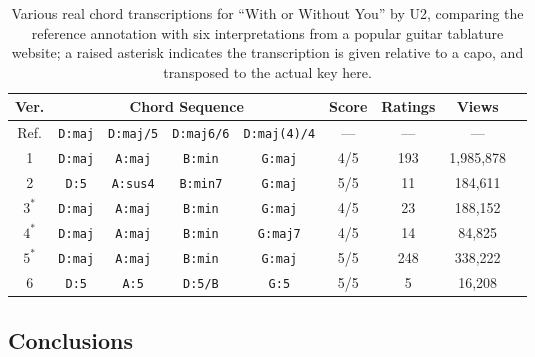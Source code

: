 \begin{table}[!t]
\small
\caption{Various real chord transcriptions for ``With or Without You'' by U2, comparing the reference annotation with six interpretations from a popular guitar tablature website; a raised asterisk indicates the transcription is given relative to a capo, and transposed to the actual key here.}
\label{tab:wowu_chords}
\centering
\begin{tabular}{ c || c c c c | c c c c |}
Ver. & \multicolumn{4}{c}{Chord Sequence} & Score & Ratings & Views \\
 \hline
Ref. & \texttt{D:maj} & \texttt{D:maj/5} & \texttt{D:maj6/6} & \texttt{D:maj(4)/4} & --- & --- & --- \\
\hline
1 & \texttt{D:maj} & \texttt{A:maj} & \texttt{B:min} & \texttt{G:maj} & 4/5 & 193 & 1,985,878 \\
2 & \texttt{D:5} & \texttt{A:sus4} & \texttt{B:min7} & \texttt{G:maj} & 5/5 & 11 & 184,611 \\
$3^*$ & \texttt{D:maj} & \texttt{A:maj} & \texttt{B:min} & \texttt{G:maj} & 4/5 & 23 & 188,152 \\
$4^*$ & \texttt{D:maj} & \texttt{A:maj} & \texttt{B:min} & \texttt{G:maj7} & 4/5 & 14 & 84,825 \\
$5^*$ & \texttt{D:maj} & \texttt{A:maj} & \texttt{B:min} & \texttt{G:maj} & 5/5 & 248 & 338,222 \\
6 & \texttt{D:5} & \texttt{A:5} & \texttt{D:5/B} & \texttt{G:5} & 5/5 & 5 & 16,208 \\
\hline
\end{tabular}
\end{table}


\subsection{Conclusions}
\label{subsec:conclusions}

